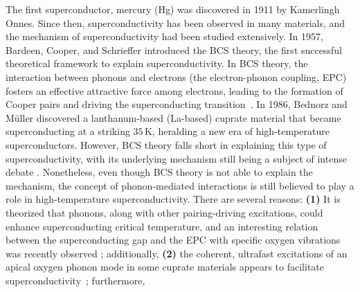 \documentclass[11pt]{article}
\begin{document}
The first superconductor, mercury (Hg) was discovered in 1911 by Kamerlingh Onnes. Since then, superconductivity has been observed in many materials, and the mechanism of superconductivity had been studied extensively.
In 1957, Bardeen, Cooper, and Schrieffer introduced the BCS theory, the first successful theoretical framework to explain superconductivity\cite{bardeen_theory_1957}. 
In BCS theory, 
the interaction between phonons and electrons (the electron-phonon coupling, EPC) fosters an effective attractive force among electrons, leading to the formation of Cooper pairs and driving the superconducting transition~\cite{bardeen_theory_1957}. 
In 1986, Bednorz and Müller discovered a lanthanum-based (La-based) cuprate material that became superconducting at a striking $35\,\mathrm{K}$\cite{bednorz_possible_1986}, heralding a new era of high-temperature superconductors. 
However, BCS theory falls short in explaining this type of superconductivity, with its underlying mechanism still being a subject of intense debate \cite{keimer_quantum_2015}.
Nonetheless, even though BCS theory is not able to explain the mechanism, the concept of phonon-mediated interactions is still believed to play a role in high-temperature superconductivity. 
There are several reasons: \textbf{(1)} It is theorized that phonons, along with other pairing-driving excitations, could enhance superconducting critical temperature\cite{johnston_systematic_2010}, and an interesting relation between the superconducting gap and the EPC with specific oxygen vibrations was recently observed \cite{he_rapid_2018}; 
additionally, \textbf{(2)} the coherent, ultrafast excitations of an apical oxygen phonon mode in some cuprate materials appears to facilitate superconductivity~\cite{kaiser_optically_2014};
furthermore, 
\end{document}
